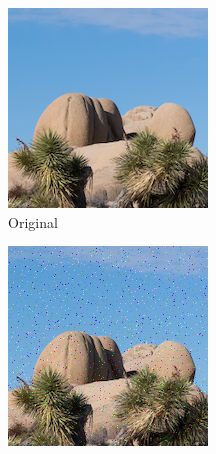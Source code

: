 \documentclass{article}
\begin{document}
\begin{figure}[htb]
    \centering
    \begin{subfigure}[b]{0.32\textwidth}
        \centering
        \includegraphics[width=\textwidth]{../Resource/cropped-image.png}
        \caption{Original}
        \label{fig:cropped-image-cyclic-bsc-original}
    \end{subfigure}
    \hfill
    \begin{subfigure}[b]{0.32\textwidth}
        \centering
        \includegraphics[width=\textwidth]{../Result/cropped-cyclic-bsc-output.png}

\end{subfigure}
\end{figure}
\end{document}
